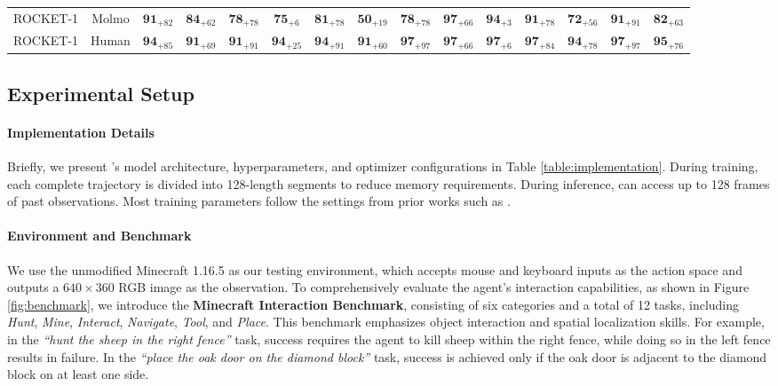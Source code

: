 \begin{table}[ht]
\begin{tabular}{@{}lcccccccccccccc@{}}
 ROCKET-1                & Molmo               &  $\mathbf{91}_{+82}$           &  $\mathbf{84}_{+62}$          &  $\mathbf{78}_{+78}$           &  $\mathbf{75}_{+6}$          & $\mathbf{81}_{+78}$              &  $\mathbf{50}_{+19}$            &  $\mathbf{78}_{+78}$             &  $\mathbf{97}_{+66}$            &  $\mathbf{94}_{+3}$           &  $\mathbf{91}_{+78}$          &  $\mathbf{72}_{+56}$           &  $\mathbf{91}_{+91}$           &  $\mathbf{82}_{+63}$                        \\
 ROCKET-1                & Human                   & $\mathbf{94}_{+85}$            &  $\mathbf{91}_{+69}$          &  $\mathbf{91}_{+91}$           & $\mathbf{94}_{+25}$           & $\mathbf{94}_{+91}$              & $\mathbf{91}_{+60}$             &   $\mathbf{97}_{+97}$            & $\mathbf{97}_{+66}$             &    $\mathbf{97}_{+6}$          &    $\mathbf{97}_{+84}$         &  $\mathbf{94}_{+78}$            &   $\mathbf{97}_{+97}$           &  $\mathbf{95}_{+76}$                        \\
 \bottomrule
\end{tabular}
\end{table}

\subsection{Experimental Setup}

\paragraph{Implementation Details} 
Briefly, we present \agent’s model architecture, hyperparameters, and optimizer configurations in Table \ref{table:implementation}. During training, each complete trajectory is divided into 128-length segments to reduce memory requirements. During inference, \agent can access up to 128 frames of past observations. Most training parameters follow the settings from prior works such as \cite{groot1, groot1-5, vpt}. 

\paragraph{Environment and Benchmark} We use the unmodified Minecraft 1.16.5 \citep{minerl,mcu} as our testing environment, which accepts mouse and keyboard inputs as the action space and outputs a $640\times360$ RGB image as the observation. To comprehensively evaluate the agent’s interaction capabilities, as shown in Figure \ref{fig:benchmark}, we introduce the \textbf{Minecraft Interaction Benchmark}, consisting of six categories and a total of 12 tasks, including \textit{Hunt}, \textit{Mine}, \textit{Interact}, \textit{Navigate}, \textit{Tool}, and \textit{Place}. This benchmark emphasizes object interaction and spatial localization skills. For example, in the \textit{``hunt the sheep in the right fence''} task, success requires the agent to kill sheep within the right fence, while doing so in the left fence results in failure. In the \textit{``place the oak door on the diamond block''} task, success is achieved only if the oak door is adjacent to the diamond block on at least one side. 

